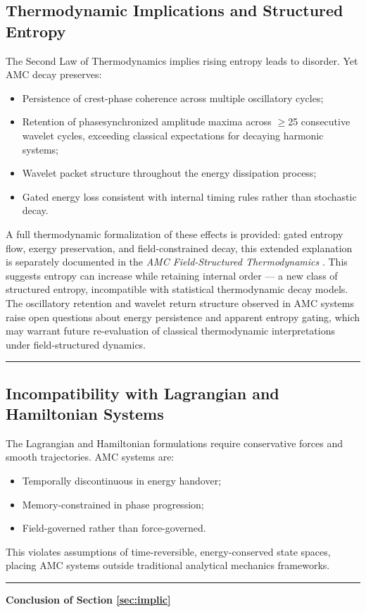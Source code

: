 \documentclass[10pt,aps,pre,onecolumn,superscriptaddress,notitlepage]{revtex4-2}
\begin{document}
\subsection{Thermodynamic Implications and Structured Entropy}
The Second Law of Thermodynamics implies rising entropy leads to disorder. Yet AMC decay preserves:
\begin{itemize}
    \item Persistence of crest-phase coherence across multiple oscillatory cycles;
    \item Retention of phase\-synchronized amplitude maxima across $\ge$25 consecutive wavelet cycles, exceeding classical expectations for decaying harmonic systems;
    \item Wavelet packet structure throughout the energy dissipation process;
    \item Gated energy loss consistent with internal timing rules rather than stochastic decay.
\end{itemize}
A full thermodynamic formalization of these effects is provided: gated entropy flow, exergy preservation, and field-constrained decay, this extended explanation is separately documented in the \textit{AMC Field-Structured Thermodynamics} \cite{karim2025fieldthermo}.
This suggests entropy can increase while retaining internal order — a new class of structured entropy, incompatible with statistical thermodynamic decay models. The oscillatory retention and wavelet return structure observed in AMC systems raise open questions about energy persistence and apparent entropy gating, which may warrant future re-evaluation of classical thermodynamic interpretations under field-structured dynamics.
\vspace{1em}
\hrule
\vspace{1em}
\subsection{Incompatibility with Lagrangian and Hamiltonian Systems}
The Lagrangian and Hamiltonian formulations require conservative forces and smooth trajectories. AMC systems are:
\begin{itemize}
    \item Temporally discontinuous in energy handover;
    \item Memory-constrained in phase progression;
    \item Field-governed rather than force-governed.
\end{itemize}
This violates assumptions of time-reversible, energy-conserved state spaces, placing AMC systems outside traditional analytical mechanics frameworks. 
\vspace{1em}
\hrule
\vspace{1em}
\textbf{Conclusion of Section \ref{sec:implic}}
\end{document}
